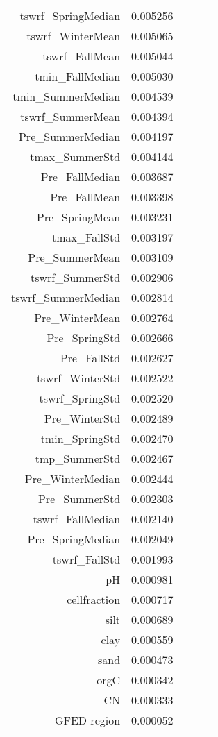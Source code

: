 \begin{tabular}{rrrrr}
tswrf_SpringMedian & 0.005256 \\
tswrf_WinterMean & 0.005065 \\
tswrf_FallMean & 0.005044 \\
tmin_FallMedian & 0.005030 \\
tmin_SummerMedian & 0.004539 \\
tswrf_SummerMean & 0.004394 \\
Pre_SummerMedian & 0.004197 \\
tmax_SummerStd & 0.004144 \\
Pre_FallMedian & 0.003687 \\
Pre_FallMean & 0.003398 \\
Pre_SpringMean & 0.003231 \\
tmax_FallStd & 0.003197 \\
Pre_SummerMean & 0.003109 \\
tswrf_SummerStd & 0.002906 \\
tswrf_SummerMedian & 0.002814 \\
Pre_WinterMean & 0.002764 \\
Pre_SpringStd & 0.002666 \\
Pre_FallStd & 0.002627 \\
tswrf_WinterStd & 0.002522 \\
tswrf_SpringStd & 0.002520 \\
Pre_WinterStd & 0.002489 \\
tmin_SpringStd & 0.002470 \\
tmp_SummerStd & 0.002467 \\
Pre_WinterMedian & 0.002444 \\
Pre_SummerStd & 0.002303 \\
tswrf_FallMedian & 0.002140 \\
Pre_SpringMedian & 0.002049 \\
tswrf_FallStd & 0.001993 \\
pH & 0.000981 \\
cellfraction & 0.000717 \\
silt & 0.000689 \\
clay & 0.000559 \\
sand & 0.000473 \\
orgC & 0.000342 \\
CN & 0.000333 \\
GFED-region & 0.000052 \\
\bottomrule
\end{tabular}
